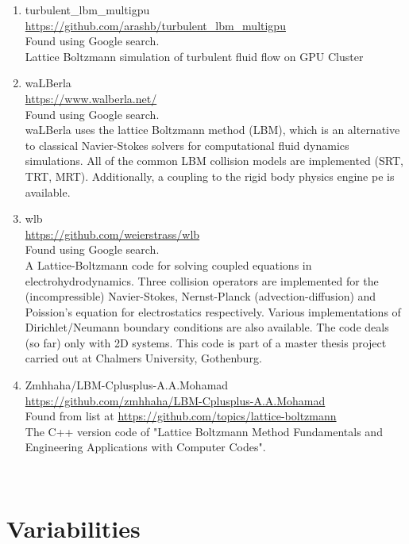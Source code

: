 \documentclass{article}
\begin{document}
\begin{enumerate}
	\item turbulent\_lbm\_multigpu
\\
	\href{https://github.com/arashb/turbulent_lbm_multigpu}{https://github.com/arashb/turbulent\_lbm\_multigpu}
\\
	Found using Google search.\\
	Lattice Boltzmann simulation of turbulent fluid flow on GPU Cluster
	
	\item waLBerla
\\
	\href{https://www.walberla.net/}{https://www.walberla.net/}
\\
	Found using Google search.\\
	waLBerla uses the lattice Boltzmann method (LBM), which is an alternative to classical Navier-Stokes solvers for computational fluid dynamics simulations. All of the common LBM collision models are implemented (SRT, TRT, MRT). Additionally, a coupling to the rigid body physics engine pe is available. 
	
	\item wlb
\\
	\href{https://github.com/weierstrass/wlb}{https://github.com/weierstrass/wlb}
\\
	Found using Google search.\\
	A Lattice-Boltzmann code for solving coupled equations in electrohydrodynamics. 
	Three collision operators are implemented for the (incompressible) Navier-Stokes, 
	Nernst-Planck (advection-diffusion) and Poission's equation for electrostatics 
	respectively. Various implementations of Dirichlet/Neumann boundary conditions 
	are also available. The code deals (so far) only with 2D systems.
	This code is part of a  master thesis project carried out at Chalmers University, 
	Gothenburg.
	
	\item Zmhhaha/LBM-Cplusplus-A.A.Mohamad
\\
	\href{https://github.com/zmhhaha/LBM-Cplusplus-A.A.Mohamad}{https://github.com/zmhhaha/LBM-Cplusplus-A.A.Mohamad} \\
		Found from list at \href{https://github.com/topics/lattice-boltzmann}{https://github.com/topics/lattice-boltzmann}\\
	The C++ version code of "Lattice Boltzmann Method Fundamentals and Engineering Applications with Computer Codes".
	
\end{enumerate}

~\newpage
\section{Variabilities}
\end{document}
